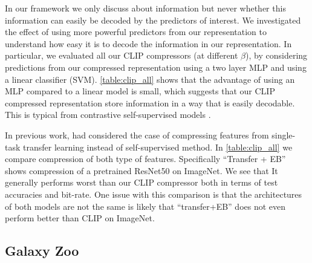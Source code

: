 \documentclass[final]{article}
\begin{document}
In our framework we only discuss about information but never whether this information can easily be decoded by the predictors of interest. 
We investigated the effect of using more powerful predictors from our representation to understand how easy it is to decode the information in our representation.
In particular, we evaluated all our CLIP compressors (\ie at different $\beta$), by considering predictions from our compressed representation using a two layer MLP and using a linear classifier (SVM).
\cref{table:clip_all} shows that the advantage of using an MLP compared to a linear model is small, which suggests that our CLIP compressed representation store information in a way that is easily decodable.
This is typical from contrastive self-supervised models \cite{oord_representation_2019,chen_simple_2020}.


In previous work, \citet{singh_end--end_2020} had considered the case of compressing features from single-task transfer learning instead of self-supervised method.
In \cref{table:clip_all} we compare compression of both type of features. Specifically ``Transfer + EB'' shows compression of a pretrained ResNet50 on ImageNet.
We see that It generally performs worst than our CLIP compressor both in terms of test accuracies and bit-rate.
One issue with this comparison is that the architectures of both models are not the same is likely that ``transfer+EB'' does not even perform better than CLIP on ImageNet.


\subsection{Galaxy Zoo}
\label{appx:galaxy}
\end{document}
